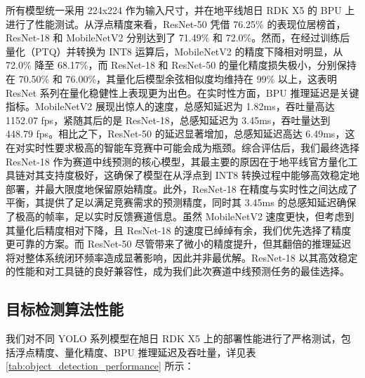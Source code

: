 \documentclass[UTF8]{ctexart}
\begin{document}
\begin{table}[htbp]
    \centering
    \caption{赛道中线预测模型性能对比}
    \label{tab:midline_performance}
\end{table}
所有模型统一采用 224x224 作为输入尺寸，并在地平线旭日 RDK X5 的 BPU 上进行了性能测试。从浮点精度来看，ResNet-50 凭借 76.25\% 的表现位居榜首，ResNet-18 和 MobileNetV2 分别达到了 71.49\% 和 72.0\%。然而，在经过训练后量化（PTQ）并转换为 INT8 运算后，MobileNetV2 的精度下降相对明显，从 72.0\% 降至 68.17\%，而 ResNet-18 和 ResNet-50 的量化精度损失极小，分别保持在 70.50\% 和 76.00\%，其量化后模型余弦相似度均维持在 99\% 以上，这表明 ResNet 系列在量化稳健性上表现更为出色。在实时性方面，BPU 推理延迟是关键指标。MobileNetV2 展现出惊人的速度，总感知延迟为 1.82ms，吞吐量高达 1152.07 fps，紧随其后的是 ResNet-18，总感知延迟为 3.45ms，吞吐量达到 448.79 fps。相比之下，ResNet-50 的延迟显著增加，总感知延迟高达 6.49ms，这在对实时性要求极高的智能车竞赛中可能会成为瓶颈。综合评估后，我们最终选择 ResNet-18 作为赛道中线预测的核心模型，其最主要的原因在于地平线官方量化工具链对其支持度极好，这确保了模型在从浮点到 INT8 转换过程中能够高效稳定地部署，并最大限度地保留原始精度。此外，ResNet-18 在精度与实时性之间达成了平衡，其提供了足以满足竞赛需求的预测精度，同时其 3.45ms 的总感知延迟确保了极高的帧率，足以实时反馈赛道信息。虽然 MobileNetV2 速度更快，但考虑到其量化后精度相对下降，且 ResNet-18 的速度已绰绰有余，我们优先选择了精度更可靠的方案。而 ResNet-50 尽管带来了微小的精度提升，但其翻倍的推理延迟将对整体系统闭环频率造成显著影响，因此并非最优解。ResNet-18 以其高效稳定的性能和对工具链的良好兼容性，成为我们此次赛道中线预测任务的最佳选择。

\subsection{目标检测算法性能}
我们对不同 YOLO 系列模型在旭日 RDK X5 上的部署性能进行了严格测试，包括浮点精度、量化精度、BPU 推理延迟及吞吐量，详见表 \ref{tab:object_detection_performance} 所示：
\end{document}

